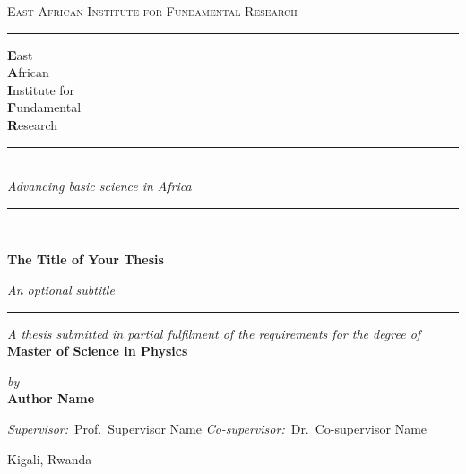 \documentclass[12pt, a4paper, openany]{book}
\newcommand{\thesistitle}{The Title of Your Thesis}
\newcommand{\thesissubtitle}{An optional subtitle}
\newcommand{\thesisauthor}{Author Name}
\newcommand{\thesisdegree}{Master of Science in Physics}
\newcommand{\thesissupervisor}{Prof.\ Supervisor Name}
\newcommand{\thesiscosupervisor}{Dr.\ Co-supervisor Name}
\newcommand{\thesisyear}{\the\year}
\newcommand{\thesislocation}{Kigali, Rwanda}
\begin{document}
\frontmatter

\begin{titlepage}
\thispagestyle{empty}
\centering

{\scshape\small\color{eaifrNavy} East African Institute for Fundamental Research}\\[4pt]
{\color{eaifrGold}\rule{5cm}{0.6pt}}

\vfill

{\fontsize{32}{38}\selectfont\rmfamily\color{eaifrNavy}%
  {\color{eaifrGold}\bfseries E}ast\\[-2pt]
  {\color{eaifrGold}\bfseries A}frican\\[-2pt]
  {\color{eaifrGold}\bfseries I}nstitute for\\[-2pt]
  {\color{eaifrGold}\bfseries F}undamental\\[-2pt]
  {\color{eaifrGold}\bfseries R}esearch\par}
\vspace{10pt}
{\color{eaifrGold}\rule{2cm}{0.8pt}}\\[8pt]
{\itshape\large\color{eaifrNavy} Advancing \textcolor{eaifrGold}{basic science} in Africa}

\vfill

{\color{eaifrNavy}\rule{0.55\linewidth}{0.4pt}}\\[10pt]
{\Huge\rmfamily\bfseries\color{eaifrNavy} \thesistitle\par}\vspace{4pt}
{\large\itshape\color{eaifrGrey} \thesissubtitle}\\[10pt]
{\color{eaifrNavy}\rule{0.55\linewidth}{0.4pt}}

\vspace{1.2cm}

{\small\itshape A thesis submitted in partial fulfilment of the requirements for the degree of}\\[4pt]
{\large\bfseries\color{eaifrNavy} \thesisdegree}

\vspace{1cm}

{\small\itshape by}\\[2pt]
{\Large\bfseries \thesisauthor}

\vspace{1cm}

{\small
  \textit{Supervisor:}~\thesissupervisor\quad\textbullet\quad
  \textit{Co-supervisor:}~\thesiscosupervisor}

\vfill
{\small\color{eaifrGrey}\thesislocation\ \ \textperiodcentered\ \ \thesisyear}
\restoregeometry
\end{titlepage}
\end{document}

